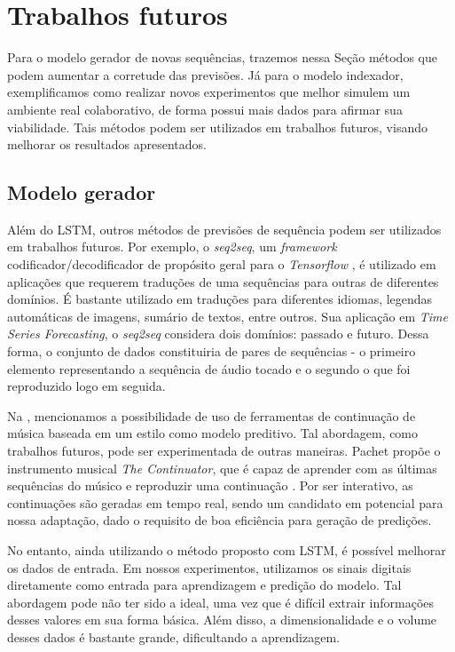 \section{Trabalhos futuros}
\label{sec:later_work}

Para o modelo gerador de novas sequências, trazemos nessa Seção métodos que podem aumentar a corretude das previsões. Já para o modelo indexador, exemplificamos como realizar novos experimentos que melhor simulem um ambiente real colaborativo, de forma possui mais dados para afirmar sua viabilidade. Tais métodos podem ser utilizados em trabalhos futuros, visando melhorar os resultados apresentados.

\subsection{Modelo gerador}

Além do LSTM, outros métodos de previsões de sequência podem ser utilizados em trabalhos futuros. Por exemplo, o \textit{seq2seq}, um \textit{framework} codificador/decodificador de propósito geral para o \textit{Tensorflow} \cite{seq2seq}, é utilizado em aplicações que requerem traduções de uma sequências para outras de diferentes domínios. É bastante utilizado em traduções para diferentes idiomas, legendas automáticas de imagens, sumário de textos, entre outros. Sua aplicação em \textit{Time Series Forecasting}, o \textit{seq2seq} considera dois domínios: passado e futuro. Dessa forma, o conjunto de dados constituiria de pares de sequências - o primeiro elemento representando a sequência de áudio tocado e o segundo o que foi reproduzido logo em seguida.

Na , mencionamos a possibilidade de uso de ferramentas de continuação de música baseada em um estilo como modelo preditivo. Tal abordagem, como trabalhos futuros, pode ser experimentada de outras maneiras. Pachet propõe o instrumento musical \textit{The Continuator}, que é capaz de aprender com as últimas sequências do músico e reproduzir uma continuação \cite{continuator}. Por ser interativo, as continuações são geradas em tempo real, sendo um candidato em potencial para nossa adaptação, dado o requisito de boa eficiência para geração de predições.

No entanto, ainda utilizando o método proposto com LSTM, é possível melhorar os dados de entrada. Em nossos experimentos, utilizamos os sinais digitais diretamente como entrada para aprendizagem e predição do modelo. Tal abordagem pode não ter sido a ideal, uma vez que é difícil extrair informações desses valores em sua forma básica. Além disso, a dimensionalidade e o volume desses dados é bastante grande, dificultando a aprendizagem.

